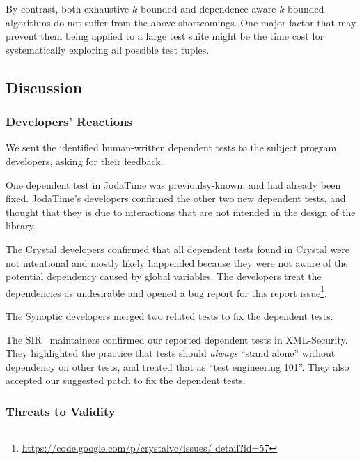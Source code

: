 By contrast, both exhaustive $k$-bounded and dependence-aware
$k$-bounded algorithms do not suffer from the above shortcomings.
One major factor that may prevent them being applied to a
large test suite might be the time cost for systematically
exploring all possible test tuples.





\subsection{Discussion}
\label{sec:expdiscussion}

\subsubsection{Developers' Reactions}

We sent the identified human-written dependent tests to the
subject program developers, asking for their feedback.

One dependent test in JodaTime was previoulsy-known,
and had already been fixed. JodaTime's
developers confirmed the other two new dependent
tests, and thought that they is due to interactions
that are not intended in the design of the library.

The Crystal developers confirmed that all dependent tests
found in Crystal were not intentional and mostly likely
happended because they were not aware of the potential dependency
caused by global variables. The developers treat the
dependencies as undesirable and opened a bug report for
this report issue\footnote{\url{https://code.google.com/p/crystalvc/issues/ detail?id=57}}.

The Synoptic developers merged two related tests to fix
the dependent tests.

The SIR~\cite{sir} maintainers confirmed our reported dependent
tests in XML-Security. They highlighted the practice
that tests should \textit{always} ``stand alone''
without dependency on other tests, and treated that as
``test engineering 101''. They also accepted our suggested
patch to fix the dependent tests.

\subsubsection{Threats to Validity}

